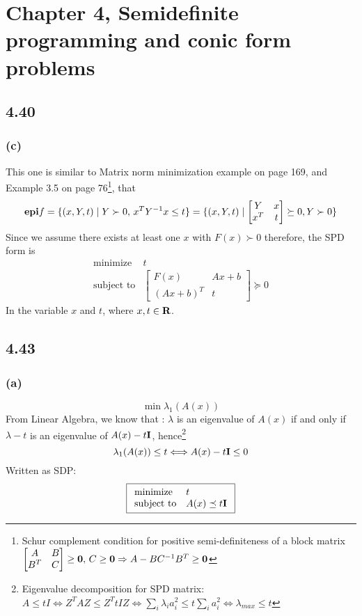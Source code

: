 \documentclass{article}
\newcommand{\reals}{{\mbox{\bf R}}}
\begin{document}
   \section*{Chapter 4, Semidefinite programming and conic form problems}	
\subsection*{4.40 }
          \subsubsection*{(c)}
          This one is similar to Matrix norm minimization example on page 169, and Example 3.5 on page 76\footnote{Schur complement condition for positive semi-definiteness of a block matrix $ \begin{bmatrix}
A & B\\
B^T & C
\end{bmatrix}  \ge {\bf 0}, \, C \ge {\bf 0} \Rightarrow A - BC^{-1}B^T \ge {\bf 0}$}, that 
          \[ {\bf epi} f  = \{(x,Y,t) \mid Y \succ 0, \, x^TY^{-1}x \le t\} = \{(x,Y,t) \mid 
          \begin{bmatrix}
Y & x\\
x^T & t
\end{bmatrix} \succeq 0, Y \succ 0
          \}\]
          Since we assume there exists at least one $x$ with $F(x) \succ 0$ therefore, the SPD form is 
                   \[  \boxed{  \begin{array}{ll}
    \mbox{minimize}   & t\\
    \mbox{subject to} &   \begin{bmatrix}
F(x) & Ax + b\\
(Ax + b)^T & t
\end{bmatrix}  \succeq 0
        \end{array} }
  \]    
   In the variable $x$ and  $t$,  where    $x, t \in \reals $.
          \subsection*{4.43 } 
            \subsubsection*{(a)}
            \[\min \lambda_1(A(x))\]
            From Linear Algebra, we know that : $\lambda$  is an eigenvalue of $A(x)$ if and only if $\lambda -t$ is an eigenvalue of $A(x) - t{\bf I}$, hence\footnote{Eigenvalue decomposition for SPD matrix:
            $A \le tI \Longleftrightarrow Z^TAZ \le Z^TtIZ \Longleftrightarrow \sum_{i}\lambda_ia_i^2 \le t\sum_i a_i^2 \Longleftrightarrow  \lambda _{max} \le t$
            } 
            \[\lambda_1(A(x)) \le t \Longleftrightarrow A(x) - t{\bf I} \le 0\]
                                Written  as SDP:
               \[  \boxed{  \begin{array}{ll}
    \mbox{minimize}   & t\\
    \mbox{subject to} & A(x)  \preceq  t{\bf I}
        \end{array}
         }
  \]    
\end{document}
